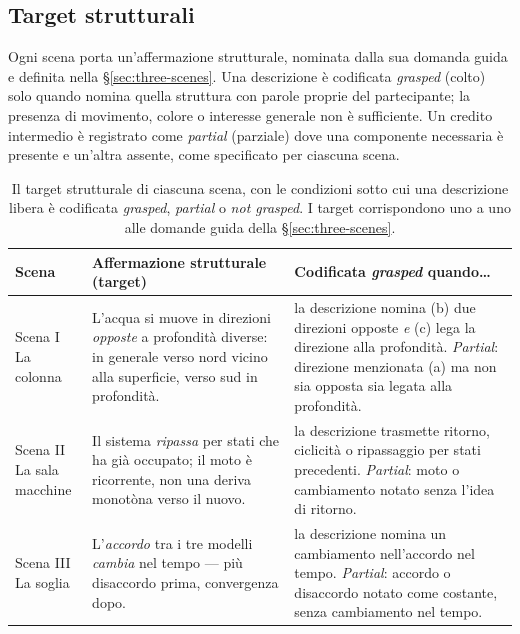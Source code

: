 \subsection{Target strutturali}
\label{subsec:app-targets}

Ogni scena porta un'affermazione strutturale, nominata dalla sua domanda guida e definita nella \S\ref{sec:three-scenes}. Una descrizione è codificata \emph{grasped} (colto) solo quando nomina quella struttura con parole proprie del partecipante; la presenza di movimento, colore o interesse generale non è sufficiente. Un credito intermedio è registrato come \emph{partial} (parziale) dove una componente necessaria è presente e un'altra assente, come specificato per ciascuna scena.

\begin{table}[htbp]
\centering
\caption[Target di codifica strutturale per scena]{Il target strutturale di ciascuna scena, con le condizioni sotto cui una descrizione libera è codificata \emph{grasped}, \emph{partial} o \emph{not grasped}. I target corrispondono uno a uno alle domande guida della \S\ref{sec:three-scenes}.}
\label{tab:coding-targets}
\small
\renewcommand{\arraystretch}{1.35}
\begin{tabularx}{\textwidth}{@{}p{2.5cm} X X@{}}
\toprule
\textbf{Scena} &
\textbf{Affermazione strutturale (target)} &
\textbf{Codificata \emph{grasped} quando\ldots} \\
\midrule

\makecell[l]{Scena I\\La colonna} &
L'acqua si muove in direzioni \emph{opposte} a profondità diverse: in generale verso nord vicino alla superficie, verso sud in profondità. &
la descrizione nomina (b) due direzioni opposte \emph{e} (c) lega la direzione alla profondità. \emph{Partial}: direzione menzionata (a) ma non sia opposta sia legata alla profondità. \\

\makecell[l]{Scena II\\La sala macchine} &
Il sistema \emph{ripassa} per stati che ha già occupato; il moto è ricorrente, non una deriva monotòna verso il nuovo. &
la descrizione trasmette ritorno, ciclicità o ripassaggio per stati precedenti. \emph{Partial}: moto o cambiamento notato senza l'idea di ritorno. \\

\makecell[l]{Scena III\\La soglia} &
L'\emph{accordo} tra i tre modelli \emph{cambia} nel tempo --- più disaccordo prima, convergenza dopo. &
la descrizione nomina un cambiamento nell'accordo nel tempo. \emph{Partial}: accordo o disaccordo notato come costante, senza cambiamento nel tempo. \\

\bottomrule
\end{tabularx}
\end{table}

